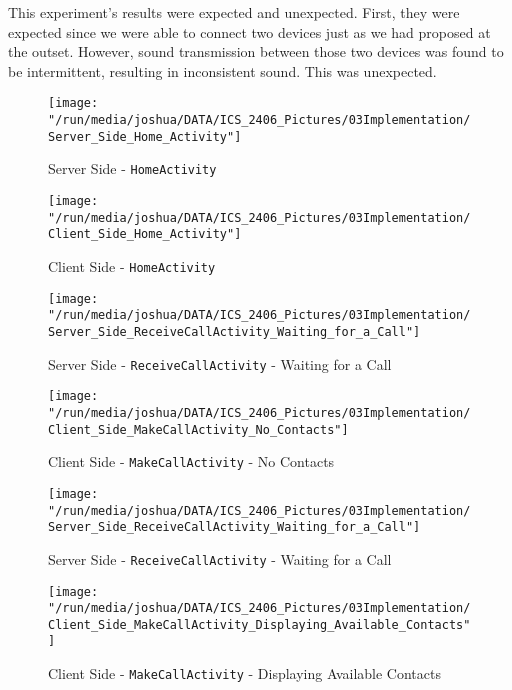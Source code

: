 \documentclass[12pt,svgnames,smaller]{article} %
\begin{document}
		This experiment's results were expected and unexpected. First, they were expected since we were able to connect two devices just as we had proposed at the outset. However, sound transmission between those two devices was found to be intermittent, resulting in inconsistent sound. This was unexpected.
		
		\clearpage
		
		\begin{figure}
			\centering
			\begin{minipage}{.5\textwidth}
				\centering
				\texttt{[image: "/run/media/joshua/DATA/ICS\_2406\_Pictures/03Implementation/Server\_Side\_Home\_Activity"]}
				\caption{Server Side - \texttt{HomeActivity}}
				\label{fig:Implementation-Figure1}			
			\end{minipage}%
			\begin{minipage}{0.5\textwidth}
				\centering
				\texttt{[image: "/run/media/joshua/DATA/ICS\_2406\_Pictures/03Implementation/Client\_Side\_Home\_Activity"]}
				\caption{Client Side - \texttt{HomeActivity}}
				\label{fig:Implementation-Figure2}
			\end{minipage}
		\end{figure} 
		
		\begin{figure}
			\centering
			\begin{minipage}{.5\textwidth}
				\centering
				\texttt{[image: "/run/media/joshua/DATA/ICS\_2406\_Pictures/03Implementation/Server\_Side\_ReceiveCallActivity\_Waiting\_for\_a\_Call"]}
				\caption{Server Side - \texttt{ReceiveCallActivity} - Waiting for a Call}
				\label{fig:Implementation-Figure3}			
			\end{minipage}%
			\begin{minipage}{0.5\textwidth}
				\centering
				\texttt{[image: "/run/media/joshua/DATA/ICS\_2406\_Pictures/03Implementation/Client\_Side\_MakeCallActivity\_No\_Contacts"]}
				\caption{Client Side - \texttt{MakeCallActivity} - No Contacts}
				\label{fig:Implementation-Figure4}
			\end{minipage}
		\end{figure} 
		
		\begin{figure}
			\centering
			\begin{minipage}{.5\textwidth}
				\centering
				\texttt{[image: "/run/media/joshua/DATA/ICS\_2406\_Pictures/03Implementation/Server\_Side\_ReceiveCallActivity\_Waiting\_for\_a\_Call"]}
				\caption{Server Side - \texttt{ReceiveCallActivity} - Waiting for a Call}
				\label{fig:Implementation-Figure5}			
			\end{minipage}%
			\begin{minipage}{0.5\textwidth}
				\centering
				\texttt{[image: "/run/media/joshua/DATA/ICS\_2406\_Pictures/03Implementation/Client\_Side\_MakeCallActivity\_Displaying\_Available\_Contacts"]}
				\caption{Client Side - \texttt{MakeCallActivity} - Displaying Available Contacts}
				\label{fig:Implementation-Figure6}
			\end{minipage}
		\end{figure} 
		
\end{document}

